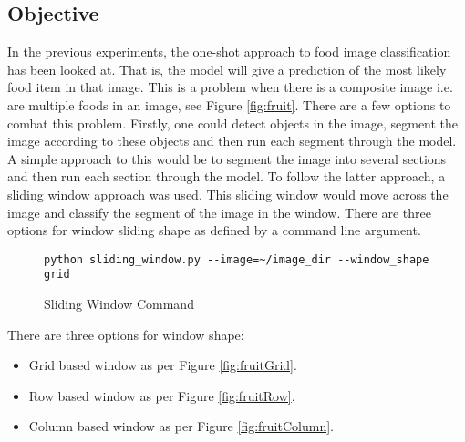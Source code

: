 \tocless\subsection{Objective}
In the previous experiments, the one-shot approach to food image
classification has been looked at. That is, the model will give a prediction of the most likely
food item in that image. This is a problem when there is a composite image i.e. are multiple foods in an
image, see Figure \ref{fig:fruit}. There are a few options to combat this problem. Firstly, one could detect
objects in the image, segment the image according to these objects and then run
each segment through the model.
A simple approach to this would be to segment
the image into several sections and then run each section through the model.
To follow the latter approach, a sliding window approach was used. This
sliding window would move across the image and classify the segment of the image
in the window. There are three options for window sliding shape as defined by a
command line argument.

\begin{figure}
\caption{Sliding Window Command}
\label{lst:slidingWindowCommand}
\begin{lstlisting}[style=Command]
python sliding_window.py --image=~/image_dir --window_shape grid
\end{lstlisting}
\end{figure}

There are three options for window shape:
\begin{itemize}
	\item{Grid based window as per Figure \ref{fig:fruitGrid}}.
	\item{Row based window as per Figure \ref{fig:fruitRow}}.
	\item{Column based window as per Figure \ref{fig:fruitColumn}}.
\end{itemize}

